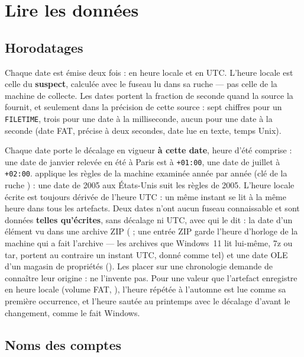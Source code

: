 \documentclass[11pt,a4paper,oneside]{report}
\begin{document}
\chapter{Lire les données}\label{chap:lecture}

\section{Horodatages}

Chaque date est émise deux fois :  en heure locale et  en
UTC. L'heure locale est celle du \textbf{suspect}, calculée avec le fuseau lu
dans sa ruche  — pas celle de la machine de collecte. Les dates
portent la fraction de seconde quand la source la fournit, et seulement dans
la précision de cette source : sept chiffres pour un \texttt{FILETIME}, trois
pour une date à la milliseconde, aucun pour une date à la seconde (date FAT,
précise à deux secondes, date lue en texte, temps Unix).

Chaque date porte le décalage en vigueur \textbf{à cette date}, heure d'été
comprise : une date de janvier relevée en été à Paris est à \texttt{+01:00},
une date de juillet à \texttt{+02:00}. \wac{} applique les règles de la machine
examinée année par année (clé  de la ruche
) : une date de 2005 aux États-Unis suit les règles de 2005.
L'heure locale écrite est toujours dérivée de l'heure UTC : un même instant se
lit à la même heure dans tous les artefacts. Deux dates n'ont aucun fuseau
connaissable et sont données \textbf{telles qu'écrites}, sans décalage ni UTC,
avec  qui le dit : la date d'un élément vu dans une archive
ZIP ( ; une entrée ZIP garde l'heure d'horloge de la
machine qui a fait l'archive — les archives que Windows~11 lit lui-même, 7z
ou tar, portent au contraire un instant UTC, donné comme tel) et une date OLE d'un magasin de propriétés
(). Les placer sur une chronologie demande de connaître
leur origine : \wac{} ne l'invente pas. Pour une valeur que l'artefact
enregistre en heure locale (volume FAT, ), l'heure répétée à l'automne est lue comme sa première occurrence, et
l'heure sautée au printemps avec le décalage d'avant le changement, comme le
fait Windows.

\section{Noms des comptes}
\end{document}
